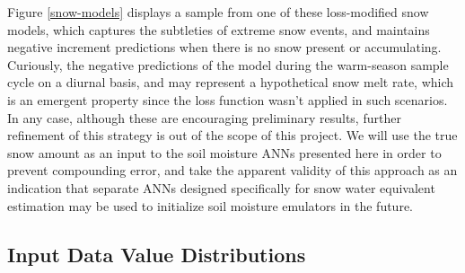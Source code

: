Figure \ref{snow-models} displays a sample from one of these loss-modified snow models, which captures the subtleties of extreme snow events, and maintains negative increment predictions when there is no snow present or accumulating. Curiously, the negative predictions of the model during the warm-season sample cycle on a diurnal basis, and may represent a hypothetical snow melt rate, which is an emergent property since the loss function wasn't applied in such scenarios. In any case, although these are encouraging preliminary results, further refinement of this strategy is out of the scope of this project. We will use the true snow amount as an input to the soil moisture ANNs presented here in order to prevent compounding error, and take the apparent validity of this approach as an indication that separate ANNs designed specifically for snow water equivalent estimation may be used to initialize soil moisture emulators in the future.

\subsection{Input Data Value Distributions}

